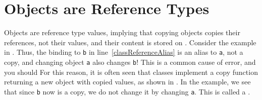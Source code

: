 \documentclass[fsharpNotes.tex]{subfiles}
\begin{document}

\clearpage

\section{Objects are Reference Types}
Objects are reference type values, implying that copying objects copies their references, not their values, and their content is stored on .%
Consider the example in .  Thus, the binding to \lstinline{b} in line~\ref{classReferenceAlias} is an alias to \lstinline{a}, not a copy, and changing object \lstinline{a} also changes \lstinline{b}! This is a common cause of error, and you should  For this reason, it is often seen that classes implement a copy function returning a new object with copied values, as shown in .  In the example, we see that since \lstinline{b} now is a copy, we do not change it by changing \lstinline{a}. This is called a .
%
%
%
%
\end{document}
